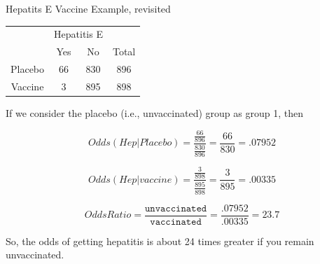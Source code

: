 \documentclass[14pt]{beamer}\usepackage[]{graphicx}\usepackage[]{color}
\begin{document}
\begin{frame}[fragile]{Hepatits E Vaccine Example, revisited}

{\footnotesize{
\begin{table}[ht]
\centering
\begin{tabular}{@{} cccc @{}} \hline
     & \multicolumn{2}{c}{Hepatitis E} \\
     & Yes & No & Total \\ \hline
     Placebo & 66 & 830 & 896 \\
     Vaccine & 3 & 895 & 898 \\ \hline
\end{tabular}
\end{table}

If we consider the placebo (i.e., unvaccinated) group as group 1, then

\begin{equation*}
Odds(Hep | Placebo) = \frac{ \frac{66}{896}}{ \frac{830}{896}} = \frac{66}{830} = .07952
\end{equation*}

\begin{equation*}
Odds(Hep | vaccine) = \frac{ \frac{3}{898}}{ \frac{895}{898}} = \frac{3}{895} = .00335
\end{equation*}

\begin{equation*}
Odds Ratio = \frac{\texttt{unvaccinated}}{\texttt{vaccinated}} = \frac{.07952}{.00335} = 23.7
\end{equation*}

So, the odds of getting hepatitis is about 24 times greater if you remain  unvaccinated.

}}
\end{frame}
\end{document}
